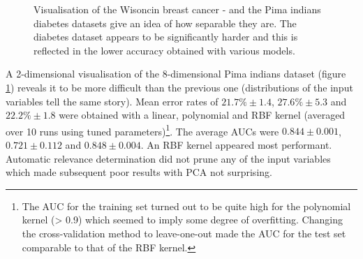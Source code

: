 \begin{figure}[htp]
\centering
{}\hfil
{}\hfil
{}\hfil
{}\hfil
\caption{Visualisation of the Wisoncin breast cancer - and the Pima indians diabetes datasets give an idea of how separable they are. The diabetes dataset appears to be significantly harder and this is reflected in the lower accuracy obtained with various models.}
\label{homeviz}
\end{figure}


A 2-dimensional visualisation of the 8-dimensional Pima indians dataset (figure \ref{homeviz}) reveals it to be more difficult than the previous one (distributions of the input variables tell the same story). Mean error rates of $21.7\%\pm 1.4$, $27.6\%\pm 5.3$ and $22.2\%\pm 1.8$ were obtained with a linear, polynomial and RBF kernel (averaged over 10 runs using tuned parameters)\footnote{The AUC for the training set turned out to be quite high for the polynomial kernel (> 0.9) which seemed to imply some degree of overfitting. Changing the cross-validation method to leave-one-out made the AUC for the test set comparable to that of the RBF kernel.}. The average AUCs were $0.844\pm 0.001$, $0.721\pm 0.112$ and $0.848\pm 0.004$. An RBF kernel appeared most performant. Automatic relevance determination did not prune any of the input variables which made subsequent poor results with PCA not surprising.

